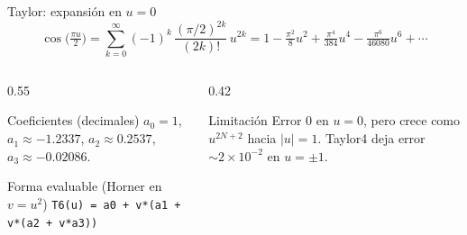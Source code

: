 \documentclass[aspectratio=169,10pt]{beamer}
\begin{document}
\begin{frame}{Taylor: expansión en $u=0$}
  \footnotesize
  \[
    \cos\!\bigl(\tfrac{\pi u}{2}\bigr)
      = \sum_{k=0}^{\infty} (-1)^{k}\,
        \frac{(\pi/2)^{2k}}{(2k)!}\, u^{2k}
      = 1 - \tfrac{\pi^{2}}{8}u^{2}
            + \tfrac{\pi^{4}}{384}u^{4}
            - \tfrac{\pi^{6}}{46080}u^{6}
            + \cdots
  \]
  \begin{columns}[T]
    \begin{column}{0.55\textwidth}
      \begin{block}{Coeficientes (decimales)}
        $a_{0}=1$,\quad
        $a_{1} \approx -1.2337$,\quad
        $a_{2} \approx 0.2537$,\quad
        $a_{3} \approx -0.02086$.
      \end{block}
      \vspace{2pt}
      \begin{block}{Forma evaluable (Horner en $v=u^{2}$)}
        \texttt{T6(u) = a0 + v*(a1 + v*(a2 + v*a3))}
      \end{block}
    \end{column}
    \begin{column}{0.42\textwidth}
      \begin{alertblock}{Limitación}
        \footnotesize
        Error 0 en $u=0$, pero crece como $u^{2N+2}$ hacia $|u|=1$.
        Taylor4 deja error $\sim 2\!\times\!10^{-2}$ en $u=\pm 1$.
      \end{alertblock}
    \end{column}
  \end{columns}
\end{frame}
\end{document}
